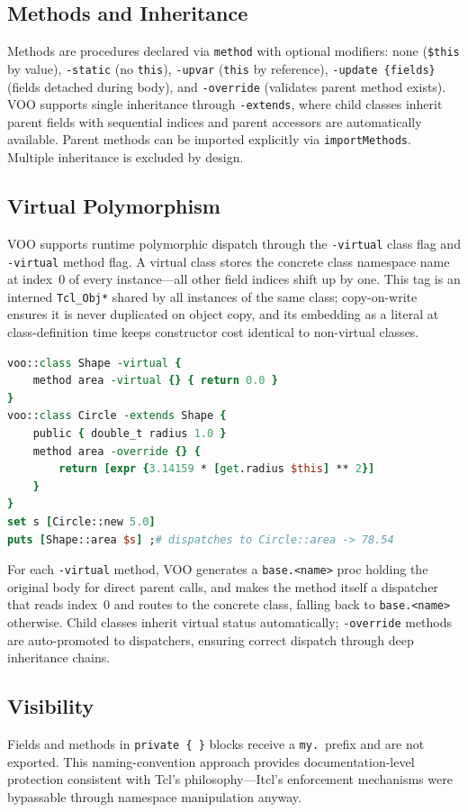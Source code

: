 \subsection{Methods and Inheritance}

Methods are procedures declared via \texttt{method} with optional modifiers:
none (\texttt{\$this} by value), \texttt{-static} (no \texttt{this}),
\texttt{-upvar} (\texttt{this} by reference), \texttt{-update \{fields\}} (fields
detached during body), and \texttt{-override} (validates parent method exists).
VOO supports single inheritance through \texttt{-extends}, where child classes inherit
parent fields with sequential indices and parent accessors are automatically available.
Parent methods can be imported explicitly via \texttt{importMethods}. Multiple inheritance
is excluded by design.

\subsection{Virtual Polymorphism}

VOO supports runtime polymorphic dispatch through the \texttt{-virtual} class flag and
\texttt{-virtual} method flag. A virtual class stores the concrete class namespace name
at index~0 of every instance---all other field indices shift up by one. This tag is an
interned \texttt{Tcl\_Obj*} shared by all instances of the same class; copy-on-write
ensures it is never duplicated on object copy, and its embedding as a literal at
class-definition time keeps constructor cost identical to non-virtual classes.

\begin{lstlisting}[language=Tcl, caption={Virtual polymorphic dispatch example}]
voo::class Shape -virtual {
    method area -virtual {} { return 0.0 }
}
voo::class Circle -extends Shape {
    public { double_t radius 1.0 }
    method area -override {} {
        return [expr {3.14159 * [get.radius $this] ** 2}]
    }
}
set s [Circle::new 5.0]
puts [Shape::area $s] ;# dispatches to Circle::area -> 78.54
\end{lstlisting}

For each \texttt{-virtual} method, VOO generates a \texttt{base.<name>} proc holding the
original body for direct parent calls, and makes the method itself a dispatcher that reads
index~0 and routes to the concrete class, falling back to \texttt{base.<name>} otherwise.
Child classes inherit virtual status automatically; \texttt{-override} methods are
auto-promoted to dispatchers, ensuring correct dispatch through deep inheritance chains.

\subsection{Visibility}

Fields and methods in \texttt{private \{ \}} blocks receive a \texttt{my.}~prefix and are
not exported. This naming-convention approach provides documentation-level protection
consistent with Tcl's philosophy---Itcl's enforcement mechanisms were bypassable through
namespace manipulation anyway.
